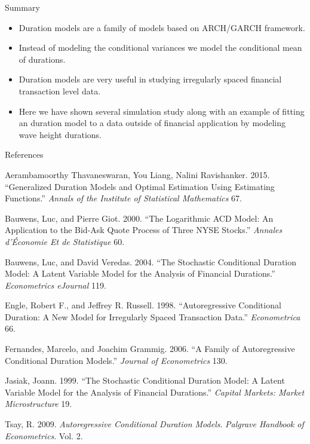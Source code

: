 \documentclass[
  ignorenonframetext,
]{beamer}
\newlength{\cslhangindent}
\newlength{\cslentryspacingunit} %
\newenvironment{CSLReferences}[2] %
 {%
  \setlength{\parindent}{0pt}
  \ifodd #1
  \let\oldpar\par
  \def\par{\hangindent=\cslhangindent\oldpar}
  \fi
  \setlength{\parskip}{#2\cslentryspacingunit}
 }%
 {}
\begin{document}
\begin{frame}{Summary}
\protect\hypertarget{summary}{}
\begin{itemize}
\item
  Duration models are a family of models based on ARCH/GARCH framework.
\item
  Instead of modeling the conditional variances we model the conditional
  mean of durations.
\item
  Duration models are very useful in studying irregularly spaced
  financial transaction level data.
\item
  Here we have shown several simulation study along with an example of
  fitting an duration model to a data outside of financial application
  by modeling wave height durations.
\end{itemize}
\end{frame}

\begin{frame}[allowframebreaks]{References}
\protect\hypertarget{references}{}
\hypertarget{refs}{}
\begin{CSLReferences}{1}{0}
\leavevmode{}%
Aerambamoorthy Thavaneswaran, You Liang, Nalini Ravishanker. 2015.
{``Generalized Duration Models and Optimal Estimation Using Estimating
Functions.''} \emph{Annals of the Institute of Statistical Mathematics}
67.

\leavevmode{}%
Bauwens, Luc, and Pierre Giot. 2000. {``The Logarithmic ACD Model: An
Application to the Bid-Ask Quote Process of Three NYSE Stocks.''}
\emph{Annales d'Économie Et de Statistique} 60.

\leavevmode{}%
Bauwens, Luc, and David Veredas. 2004. {``The Stochastic Conditional
Duration Model: A Latent Variable Model for the Analysis of Financial
Durations.''} \emph{Econometrics eJournal} 119.

\leavevmode{}%
Engle, Robert F., and Jeffrey R. Russell. 1998. {``Autoregressive
Conditional Duration: A New Model for Irregularly Spaced Transaction
Data.''} \emph{Econometrica} 66.

\leavevmode{}%
Fernandes, Marcelo, and Joachim Grammig. 2006. {``A Family of
Autoregressive Conditional Duration Models.''} \emph{Journal of
Econometrics} 130.

\leavevmode{}%
Jasiak, Joann. 1999. {``The Stochastic Conditional Duration Model: A
Latent Variable Model for the Analysis of Financial Durations.''}
\emph{Capital Markets: Market Microstructure} 19.

\leavevmode{}%
Tsay, R. 2009. \emph{Autoregressive Conditional Duration Models}.
\emph{Palgrave Handbook of Econometrics}. Vol. 2.

\end{CSLReferences}
\end{frame}
\end{document}
